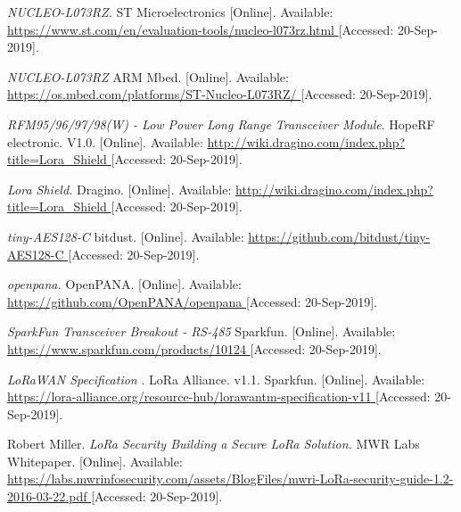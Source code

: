 \begin{thebibliography}{9}




\textit{
NUCLEO-L073RZ.
}
ST Microelectronics
[Online]. Available:
\url{
https://www.st.com/en/evaluation-tools/nucleo-l073rz.html
}
[Accessed: 20-Sep-2019].


\textit{
NUCLEO-L073RZ
}
ARM Mbed.
[Online]. Available:
\url{
https://os.mbed.com/platforms/ST-Nucleo-L073RZ/
}
[Accessed: 20-Sep-2019].


\textit{
RFM95/96/97/98(W) - Low Power Long Range Transceiver Module}.
HopeRF electronic.
V1.0.
[Online]. Available:
\url{
http://wiki.dragino.com/index.php?title=Lora_Shield
}
[Accessed: 20-Sep-2019].



\textit{
Lora Shield.
}
Dragino.
[Online]. Available:
\url{
http://wiki.dragino.com/index.php?title=Lora_Shield
}
[Accessed: 20-Sep-2019].



\textit{
tiny-AES128-C
}
bitdust.
[Online]. Available:
\url{
https://github.com/bitdust/tiny-AES128-C
}
[Accessed: 20-Sep-2019].



\textit{
openpana.
}
OpenPANA.
[Online]. Available:
\url{
https://github.com/OpenPANA/openpana
}
[Accessed: 20-Sep-2019].



\textit{
SparkFun Transceiver Breakout - RS-485
}
Sparkfun.
[Online]. Available:
\url{
https://www.sparkfun.com/products/10124
}
[Accessed: 20-Sep-2019].




\textit{
LoRaWAN Specification
}.
LoRa Alliance.
v1.1.
Sparkfun.
[Online]. Available:
\url{
https://lora-alliance.org/resource-hub/lorawantm-specification-v11
}
[Accessed: 20-Sep-2019].




Robert Miller.
\textit{
LoRa Security
Building a Secure LoRa Solution.
}
MWR Labs Whitepaper.
[Online]. Available:
\url{
https://labs.mwrinfosecurity.com/assets/BlogFiles/mwri-LoRa-security-guide-1.2-2016-03-22.pdf
}
[Accessed: 20-Sep-2019].





\end{thebibliography}
